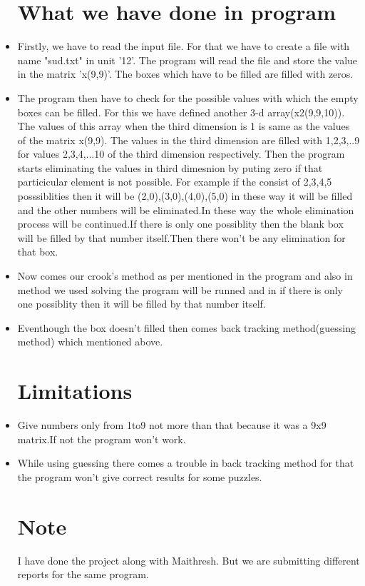 \documentclass[12pt]{article}
\begin{document}
\begin{itemize}
\section{What we have done in program}
\item  Firstly, we have to read the input file. For that we have to create a file with name "sud.txt" in unit '12'. The program will read the file and store the value in the matrix 'x(9,9)'. The boxes which have to be filled are filled with zeros.  
\item The program then have to check for the possible values with which the empty boxes can be filled. For this we have defined another 3-d array(x2(9,9,10)). The values of this array when the third dimension is 1 is same as the values of the matrix x(9,9). The values in the third dimension are filled with 1,2,3,..9  for values 2,3,4,...10 of the third dimension respectively. Then the program starts eliminating the values in third dimesnion by puting zero if that particicular element is not possible. For example if the consist of 2,3,4,5 posssiblities then it will be (2,0),(3,0),(4,0),(5,0) in these way it will be filled and the other numbers will be eliminated.In these way the whole elimination process will be continued.If there is only one possiblity then the blank box will be filled by that number itself.Then there won't be any elimination for that box.
\item Now comes our crook's method as per mentioned in the program and also in method we used solving the program will be runned and in if there is only one possiblity then it will be filled by that number itself.
\item Eventhough the box doesn't filled then comes back tracking method(guessing method) which mentioned above.

\section{Limitations}
\item Give numbers only from 1to9 not more than that because it was a 9x9 matrix.If not the program won't work.
\item While using guessing there comes a trouble in back tracking method for that the program won't give correct results for some puzzles.

\section{Note} 
I have done the project along with Maithresh. But we are submitting different reports for the same program. 

\end{itemize}         
\end{document}
